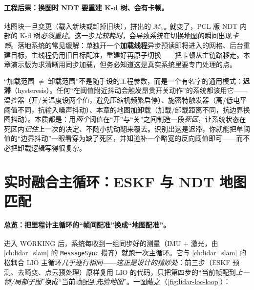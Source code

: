\paragraph{工程后果：换图时 NDT 要重建 K-d 树、会有卡顿。}
地图块一旦变更（载入新块或卸掉旧块），拼出的 $\mathcal M_{\mathrm{loc}}$ 就变了，PCL 版 NDT 内部的 K-d 树\emph{必须重建}。这一步\emph{比较耗时}，会导致系统在切换地图的瞬间出现\emph{卡顿}。落地系统的常见缓解：单独开一个\textbf{加载线程}异步预读即将进入的网格、后台重建目标，主线程仍用旧目标配准，重建好再原子切换——把卡顿从主链路移走。本章演示版为求清晰用同步加载，但务必知道这是真实系统里要专门处理的点。

\begin{insight}\label{ins:lidar-loc-hysteresis}
“加载范围 $\ne$ 卸载范围”不是随手设的工程参数，而是一个有名字的通用模式：\textbf{迟滞}（hysteresis）。任何“在阈值附近抖动会触发昂贵开关动作”的系统都该用它——温控器（开/关温度设两个值，避免压缩机频繁启停）、施密特触发器（高/低电平阈值不同，抗输入噪声抖动）、本章的地图加卸载（加载/卸载距离不同，抗边界换图抖动）。本质都是：用\emph{两个}阈值在“开”与“关”之间制造一段\emph{死区}，让系统状态在死区内\emph{记住}上一次的决定、不随小扰动翻来覆去。识别出这是迟滞，你就能把单阈值的“边界抖动”一眼看穿为缺了死区，并知道补一个略宽的反向阈值即可——而不必把卸载逻辑写得很复杂。
\end{insight}

\section{实时融合主循环：ESKF 与 NDT 地图匹配}
\label{sec:lidar-loc-loop}

\paragraph{总览：把里程计主循环的“帧间配准”换成“地图配准”。}
进入 \textsf{WORKING} 后，系统每收到一组同步好的测量（IMU + 激光，由 \cref{ch:lidar_slam} 的 \texttt{MessageSync} 攒齐）就跑一次主循环。它与 \cref{ch:lidar_slam} 的松耦合 LIO 主循环\emph{几乎逐行相同}——\emph{这正是设计的精妙处}：前三步（ESKF 预测、去畸变、点云预处理）原样复用 LIO 的代码，只把第四步的“当前帧配到\emph{上一帧/局部子图}”换成“当前帧配到\emph{先验地图}”。一图蔽之（\cref{fig:lidar-loc-loop}）：

